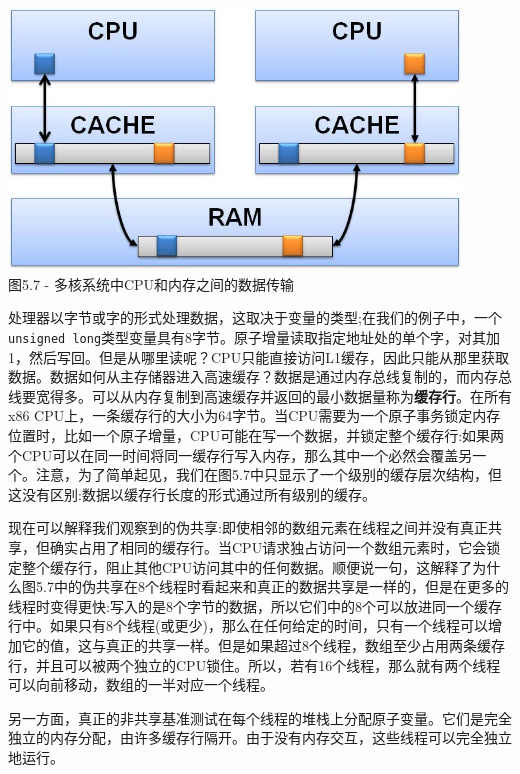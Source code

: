 \hspace*{\fill} \\ %
\begin{center}
\includegraphics[width=0.9\textwidth]{content/1/chapter5/images/7.jpg}\\
图5.7 - 多核系统中CPU和内存之间的数据传输
\end{center}

处理器以字节或字的形式处理数据，这取决于变量的类型;在我们的例子中，一个\texttt{unsigned long}类型变量具有8字节。原子增量读取指定地址处的单个字，对其加1，然后写回。但是从哪里读呢？CPU只能直接访问L1缓存，因此只能从那里获取数据。数据如何从主存储器进入高速缓存？数据是通过内存总线复制的，而内存总线要宽得多。可以从内存复制到高速缓存并返回的最小数据量称为\textbf{缓存行}。在所有x86 CPU上，一条缓存行的大小为64字节。当CPU需要为一个原子事务锁定内存位置时，比如一个原子增量，CPU可能在写一个数据，并锁定整个缓存行:如果两个CPU可以在同一时间将同一缓存行写入内存，那么其中一个必然会覆盖另一个。注意，为了简单起见，我们在图5.7中只显示了一个级别的缓存层次结构，但这没有区别:数据以缓存行长度的形式通过所有级别的缓存。

现在可以解释我们观察到的伪共享:即使相邻的数组元素在线程之间并没有真正共享，但确实占用了相同的缓存行。当CPU请求独占访问一个数组元素时，它会锁定整个缓存行，阻止其他CPU访问其中的任何数据。顺便说一句，这解释了为什么图5.7中的伪共享在8个线程时看起来和真正的数据共享是一样的，但是在更多的线程时变得更快:写入的是8个字节的数据，所以它们中的8个可以放进同一个缓存行中。如果只有8个线程(或更少)，那么在任何给定的时间，只有一个线程可以增加它的值，这与真正的共享一样。但是如果超过8个线程，数组至少占用两条缓存行，并且可以被两个独立的CPU锁住。所以，若有16个线程，那么就有两个线程可以向前移动，数组的一半对应一个线程。

另一方面，真正的非共享基准测试在每个线程的堆栈上分配原子变量。它们是完全独立的内存分配，由许多缓存行隔开。由于没有内存交互，这些线程可以完全独立地运行。

